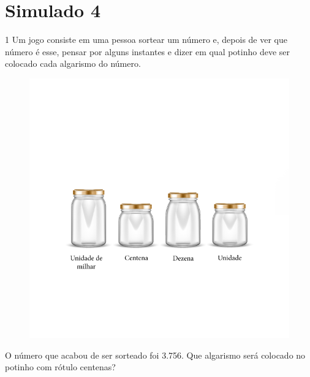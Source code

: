 \chapter{Simulado 4}

\num{1} Um jogo consiste em uma pessoa sortear um número e, depois de ver
que número é esse, pensar por alguns instantes e dizer em qual potinho
deve ser colocado cada algarismo do número.

\begin{figure}[htpb!]
\includegraphics[width=\textwidth]{../ilustracoes/MAT5/SAEB_5ANO_MAT_figura123.png}
\end{figure}

O número que acabou de ser sorteado foi 3.756. Que algarismo será
colocado no potinho com rótulo centenas?

